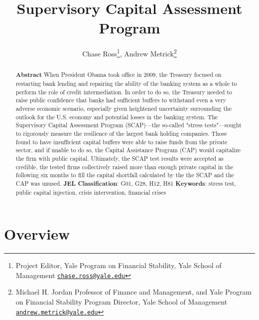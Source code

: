 \documentclass[justified, nobib]{tufte-handout2}
\title{Supervisory Capital Assessment Program}%
\author{Chase Ross\thanks{ Project Editor, Yale Program on Financial Stability, Yale School of Management \newline \texttt{\href{mailto:chase.ross@yale.edu}{chase.ross@yale.edu}}}, Andrew Metrick\thanks{Michael H. Jordan Professor of Finance and Management, and Yale Program on Financial Stability Program Director, Yale School of Management \newline \texttt{\href{mailto:andrew.metrick@yale.edu}{andrew.metrick@yale.edu}}}}
\begin{document}
\rhead{\small \plaintitle}
\rfoot{\small \thepage}





\maketitle%

\begin{abstract}
\textbf{Abstract} 
\newline
\newline
When President Obama took office in 2009, the Treasury focused on
restarting bank lending and repairing the ability of the banking system
as a whole to perform the role of credit intermediation. In order to do
so, the Treasury needed to raise public confidence that banks had
sufficient buffers to withstand even a very adverse economic scenario,
especially given heightened uncertainty surrounding the outlook for the
U.S. economy and potential losses in the banking system. The Supervisory
Capital Assessment Program (SCAP)---the so-called "stress
tests"---sought to rigorously measure the resilience of the largest bank
holding companies. Those found to have insufficient capital buffers were
able to raise funds from the private sector, and if unable to do so, the
Capital Assistance Program (CAP) would capitalize the firm with public
capital. Ultimately, the SCAP test results were accepted as credible,
the tested firms collectively raised more than enough private capital in
the following six months to fill the capital shortfall calculated by the
the SCAP and the CAP was unused.
\newline
\newline
\textbf{JEL Classification}: G01, G28, H12, H81
\newline
\textbf{Keywords}: stress test, public capital injection, crisis intervention, financial crises

\end{abstract}

\section{Overview}
\end{document}
